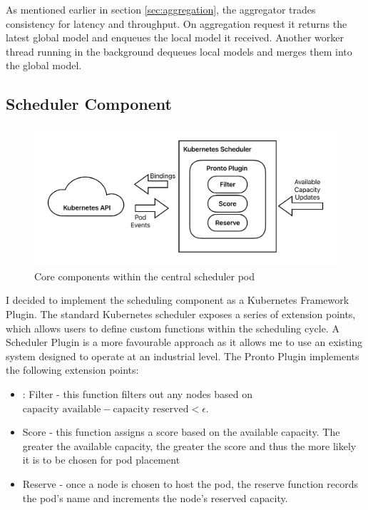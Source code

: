 As mentioned earlier in section \ref{sec:aggregation}, the aggregator trades
consistency for latency and throughput. On aggregation request it returns the
latest global model and enqueues the local model it received. Another worker
thread running in the background dequeues local models and merges them into the
global model.

\subsection{Scheduler Component}
\begin{figure}[h]
    \centering
    \includegraphics[width=\textwidth]{images/pronto-sched.pdf}
    \caption{Core components within the central scheduler pod}
    \label{pronto-agg-components}
\end{figure}

I decided to implement the scheduling component as a Kubernetes Framework
Plugin. The standard Kubernetes scheduler exposes a series of extension points,
which allows users to define custom functions within the scheduling cycle. A
Scheduler Plugin is a more favourable approach as it allows me to use an
existing system designed to operate at an industrial level. The Pronto Plugin
implements the following extension points:
\begin{itemize}
    \item: Filter - this function filters out any nodes based on $
        \text{capacity available} - \text{capacity reserved} < \epsilon$.
    \item Score - this function assigns a score based on the available capacity.
        The greater the available capacity, the greater the score and thus the
        more likely it is to be chosen for pod placement
    \item Reserve - once a node is chosen to host the pod, the reserve function
        records the pod's name and increments the node's reserved capacity.
\end{itemize}

